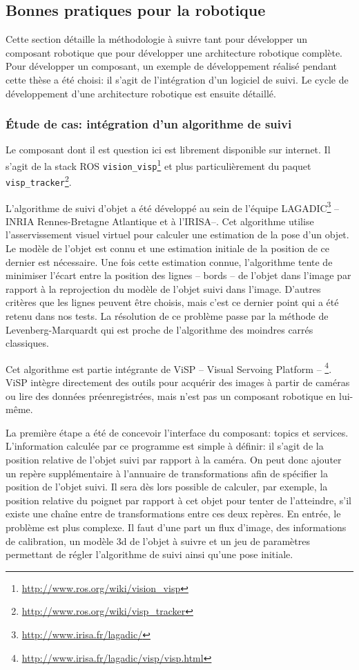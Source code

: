 \subsection{Bonnes pratiques pour la robotique}

Cette section détaille la méthodologie à suivre tant pour développer
un composant robotique que pour développer une architecture robotique
complète. Pour développer un composant, un exemple de développement
réalisé pendant cette thèse a été choisi: il s'agit de l'intégration
d'un logiciel de suivi. Le cycle de développement d'une architecture
robotique est ensuite détaillé.


\subsubsection{Étude de cas: intégration d'un algorithme de suivi}

Le composant dont il est question ici est librement disponible sur
internet. Il s'agit de la stack ROS
\texttt{vision\_visp}\footnote{\url{http://www.ros.org/wiki/vision_visp}}
et plus particulièrement du paquet
\texttt{visp\_tracker}\footnote{\url{http://www.ros.org/wiki/visp_tracker}}.


L'algorithme de suivi d'objet a été développé au sein de l'équipe
LAGADIC\footnote{\url{http://www.irisa.fr/lagadic/}} -- INRIA
Rennes-Bretagne Atlantique et à l'IRISA--. Cet algorithme utilise
l'asservissement visuel virtuel pour calculer une estimation de la
pose d'un objet. Le modèle de l'objet est connu et une estimation
initiale de la position de ce dernier est nécessaire. Une fois cette
estimation connue, l'algorithme tente de minimiser l'écart entre la
position des lignes -- bords -- de l'objet dans l'image par rapport à
la reprojection du modèle de l'objet suivi dans l'image. D'autres
critères que les lignes peuvent être choisis, mais c'est ce dernier
point qui a été retenu dans nos tests. La résolution de ce problème
passe par la méthode de Levenberg-Marquardt qui est proche de
l'algorithme des moindres carrés classiques.


Cet algorithme est partie intégrante de ViSP -- Visual Servoing
Platform
-- \footnote{\url{http://www.irisa.fr/lagadic/visp/visp.html}}. ViSP
intègre directement des outils pour acquérir des images à partir de
caméras ou lire des données préenregistrées, mais n'est pas un
composant robotique en lui-même.


La première étape a été de concevoir l'interface du composant: topics
et services. L'information calculée par ce programme est simple à
définir: il s'agit de la position relative de l'objet suivi par
rapport à la caméra. On peut donc ajouter un repère supplémentaire à
l'annuaire de transformations afin de spécifier la position de l'objet
suivi. Il sera dès lors possible de calculer, par exemple, la position
relative du poignet par rapport à cet objet pour tenter de
l'atteindre, s'il existe une chaîne entre de transformations entre ces
deux repères. En entrée, le problème est plus complexe. Il faut d'une
part un flux d'image, des informations de calibration, un modèle 3d de
l'objet à suivre et un jeu de paramètres permettant de régler
l'algorithme de suivi ainsi qu'une pose initiale.

